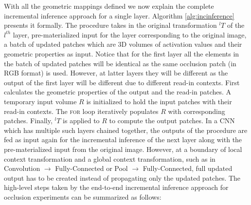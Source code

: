 With all the geometric mappings defined we now explain the complete incremental inference approach for a single layer.
Algorithm \ref{alg:incinference} presents it formally.
The  procedure takes in the original transformation $^lT$ of the $l^{th}$ layer, pre-materialized input for the layer corresponding to the original image, a batch of updated patches which are 3D volumes of activation values and their geometric properties as input.
Notice that for the first layer all the elements in the batch of updated patches will be identical as the same occlusion patch (in RGB format) is used.
However, at latter layers they will be different as the output of the first layer will be different due to different read-in contexts.
First  calculates the geometric properties of the output and the read-in patches.
A temporary input volume $R$ is initialized to hold the input patches with their read-in contexts.
The \textsc{for} loop iteratively populates $R$ with corresponding patches.
Finally, ${}^lT$ is applied to $R$ to compute the output patches.
In a CNN which has multiple such layers chained together, the outputs of the  procedure are fed as input again for the incremental inference of the next layer along with the pre-materialized input from the original image.
However, at a boundary of local context transformation and a global context transformation, such as in Convolution $\rightarrow$ Fully-Connected or Pool $\rightarrow$ Fully-Connected, full updated output has to be created  instead of propagating only the updated patches.
The high-level steps taken by the end-to-end incremental inference approach for occlusion experiments can be summarized as follows:

